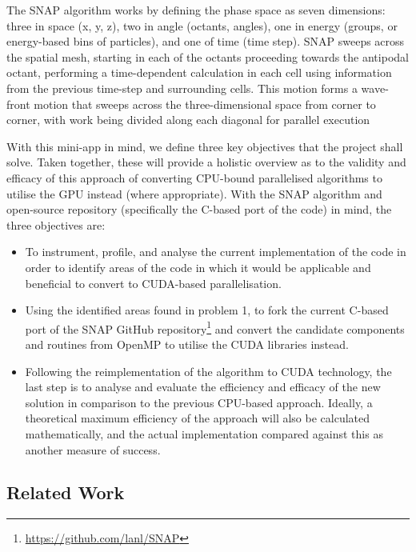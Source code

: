 \documentclass[conference]{IEEEtran}
\begin{document}
The SNAP algorithm works by defining the phase space as seven dimensions: three in space (x, y, z), two in angle (octants, angles), one in energy (groups, or energy-based bins of particles), and one of time (time step). SNAP sweeps across the spatial mesh, starting in each of the octants proceeding towards the antipodal octant, performing a time-dependent calculation in each cell using information from the previous time-step and surrounding cells. This motion forms a wave-front motion that sweeps across the three-dimensional space from corner to corner, with work being divided along each diagonal for parallel execution

With this mini-app in mind, we define three key objectives that the project shall solve. Taken together, these will provide a holistic overview as to the validity and efficacy of this approach of converting CPU-bound parallelised algorithms to utilise the GPU instead (where appropriate). With the SNAP algorithm and open-source repository (specifically the C-based port of the code) in mind, the three objectives are:

\begin{itemize}

\item To instrument, profile, and analyse the current implementation of the code in order to identify areas of the code in which it would be applicable and beneficial to convert to CUDA-based parallelisation.

\item Using the identified areas found in problem 1, to fork the current C-based port of the SNAP GitHub repository\footnote{\url{https://github.com/lanl/SNAP}} and convert the candidate components and routines from OpenMP to utilise the CUDA libraries instead.

\item Following the reimplementation of the algorithm to CUDA technology, the last step is to analyse and evaluate the efficiency and efficacy of the new solution in comparison to the previous CPU-based approach. Ideally, a theoretical maximum efficiency of the approach will also be calculated mathematically, and the actual implementation compared against this as another measure of success.

\end{itemize}


\subsection{Related Work}
\end{document}
